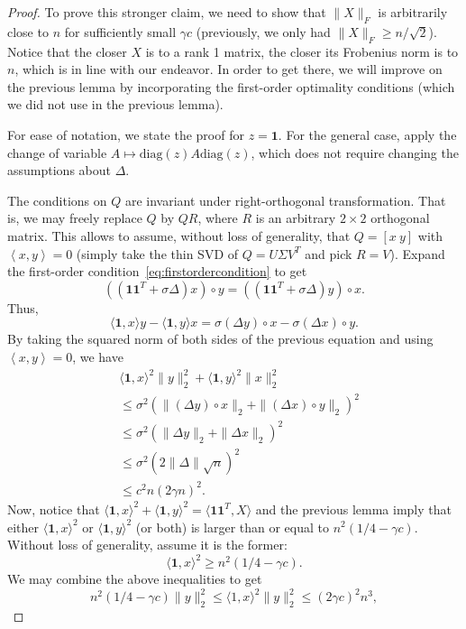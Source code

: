\documentclass{colt2016} %
\newcommand{\inner}[2]{\left\langle{#1},{#2}\right\rangle}
\newcommand{\diag}{\mathrm{diag}}
\newcommand{\1}{\mathbf{1}}
\begin{document}
\begin{proof}
	To prove this stronger claim, we need to show that $\|X\|_F$ is arbitrarily close to $n$ for sufficiently small $\gamma c$ (previously, we only had $\|X\|_F \geq n/\sqrt{2}$). Notice that the closer $X$ is to a rank 1 matrix, the closer its Frobenius norm is to $n$, which is in line with our endeavor. In order to get there, we will improve on the previous lemma by incorporating the first-order optimality conditions (which we did not use in the previous lemma).
	
	For ease of notation, we state the proof for $z = \1$. For the general case, apply the change of variable $A \mapsto \diag(z)A\diag(z)$, which does not require changing the assumptions about $\Delta$.
	
	The conditions on $Q$ are invariant under right-orthogonal transformation. That is, we may freely replace $Q$ by $QR$, where $R$ is an arbitrary $2\times 2$ orthogonal matrix. This allows to assume, without loss of generality, that $Q = [x \ y]$ with $\inner{x}{y} = 0$ (simply take the thin SVD of $Q = U\Sigma V^T$ and pick $R = V$). Expand the first-order condition~\eqref{eq:firstordercondition} to get
	\[
	((\1\1^T +\sigma \Delta)x)\circ y = ((\1\1^T +\sigma \Delta)y)\circ x.
	\]
	Thus,
	\[
	\langle \1,x\rangle y - \langle \1, y \rangle x = \sigma (\Delta y)\circ x - \sigma (\Delta x)\circ y.
	\]
	By taking the squared norm of both sides of the previous equation and using $\inner{x}{y}=0$, we have 
	\begin{align*}
	&\langle \1,x\rangle^2  \|y\|_2^2 + \langle \1, y \rangle^2 \| x \|_2^2 \\
	&\leq \sigma^2 \left( \|(\Delta y)\circ x\|_2 + \| (\Delta x)\circ y\|_2 \right)^2 \\
	& \leq \sigma^2 \left( \| \Delta y\|_2 + \|\Delta x\|_2 \right)^2\\
	&\leq \sigma^2 \left( 2\|\Delta\| \sqrt{n} \right)^2 \\
	&\leq c^2 n(2\gamma n)^2.
	\end{align*}
	Now, notice that $\langle \1, x\rangle^2 + \langle \1, y \rangle^2 = \langle \1\1^T, X \rangle$ and the previous lemma imply that either $\langle \1,x\rangle^2$ or $\langle \1,y\rangle^2$ (or both) is larger than or equal to $n^2(1/4 - \gamma c)$. Without loss of generality, assume it is the former:
	\[
	\langle \1,x\rangle^2 \geq n^2(1/4 - \gamma c).
	\]
	We may combine the above inequalities to get
	\[
	n^2(1/4 - \gamma c) \|y\|_2^2 \leq \langle 1,x\rangle^2 \|y\|_2^2 \leq (2\gamma c)^2 n^3,
\]
\end{proof}
\end{document}
